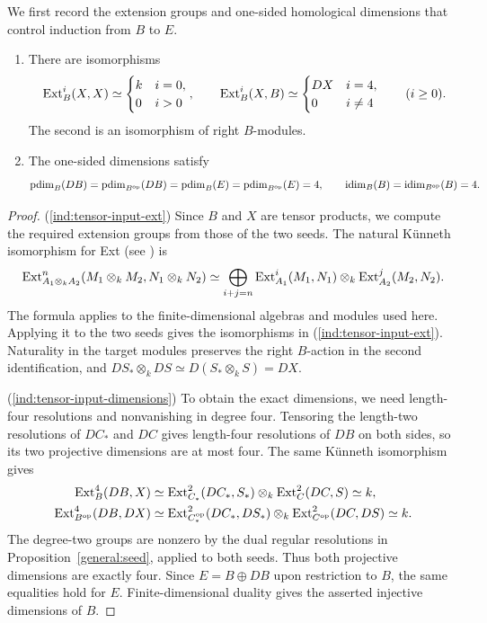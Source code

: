 \documentclass[11pt]{article}
\begin{document}
We first record the extension groups and one-sided homological
dimensions that control induction from $B$ to $E$.

\begin{Lem}\label{ind:tensor-input}
\leavevmode
\begin{enumerate}
\item\label{ind:tensor-input-ext} There are isomorphisms
\begin{equation*}
 {\rm Ext}_B^i(X,X)\simeq\begin{cases}k&i=0,\\0&i>0\end{cases},\qquad
 {\rm Ext}_B^i(X,B)\simeq\begin{cases}DX&i=4,\\0&i\ne4\end{cases}
 \qquad(i\ge0).
\end{equation*}
The second is an isomorphism of right $B$-modules.
\item\label{ind:tensor-input-dimensions} The one-sided dimensions satisfy
\begin{equation*}
 {\rm pdim}_B(DB)={\rm pdim}_{B^{\mathrm{op}}}(DB)
 ={\rm pdim}_B(E)={\rm pdim}_{B^{\mathrm{op}}}(E)=4,
 \qquad {\rm idim}_B(B)={\rm idim}_{B^{\mathrm{op}}}(B)=4.
\end{equation*}
\end{enumerate}
\end{Lem}
\begin{proof}
\textup{(\ref{ind:tensor-input-ext})} Since $B$ and $X$ are tensor products, we compute the
required extension groups from those of the two seeds. The natural
K\"unneth isomorphism for Ext (see \cite[Theorem~XI.3.1]{CE}) is
\[
 {\rm Ext}_{A_1\otimes_k A_2}^n(M_1\otimes_k M_2,N_1\otimes_k N_2)
 \simeq\bigoplus_{i+j=n}
 {\rm Ext}_{A_1}^i(M_1,N_1)\otimes_k{\rm Ext}_{A_2}^j(M_2,N_2).
\]
The formula applies to the finite-dimensional algebras and modules
used here. Applying it to the two seeds gives the isomorphisms in
\textup{(\ref{ind:tensor-input-ext})}.
Naturality in the target modules preserves the right $B$-action
in the second identification, and
$DS_*\otimes_k DS\simeq D(S_*\otimes_k S)=DX$.

\textup{(\ref{ind:tensor-input-dimensions})} To obtain the exact dimensions, we need length-four
resolutions and nonvanishing in degree four. Tensoring the length-two
resolutions of $DC_*$ and $DC$ gives
length-four resolutions of $DB$ on both sides, so its two
projective dimensions are at most four. The same K\"unneth
isomorphism gives
\[
 \begin{aligned}
 {\rm Ext}_B^4(DB,X)&\simeq
  {\rm Ext}_{C_*}^2(DC_*,S_*)\otimes_k{\rm Ext}_C^2(DC,S)\simeq k,\\
 {\rm Ext}_{B^{\mathrm{op}}}^4(DB,DX)&\simeq
  {\rm Ext}_{C_*^{\mathrm{op}}}^2(DC_*,DS_*)\otimes_k
  {\rm Ext}_{C^{\mathrm{op}}}^2(DC,DS)\simeq k.
 \end{aligned}
\]
The degree-two groups are nonzero by the dual regular resolutions
in Proposition~\ref{general:seed}, applied to both seeds. Thus both
projective dimensions are exactly four. Since $E=B\oplus DB$ upon
restriction to $B$, the same equalities hold for $E$. Finite-dimensional
duality gives the asserted injective dimensions of $B$.
\end{proof}
\end{document}
